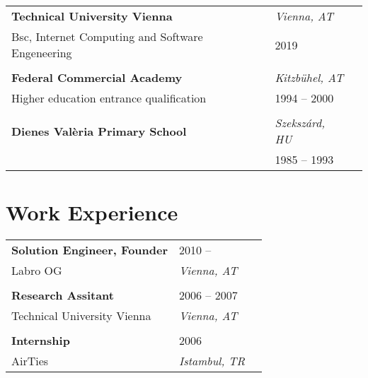 \documentclass[letterpaper,11pt]{article}
\begin{document}
\vspace{-1em}
\begin{longtable}{  L{0.70\textwidth}  R{0.25\textwidth}  R{0.05\textwidth }} 
		\textbf{Technical University Vienna} &  \textit{Vienna, AT} \\

	Bsc, Internet Computing and Software Engeneering & 2019 \\ 
\vspace{1pt}\\
		\textbf{Federal Commercial Academy} &  \textit{Kitzb\"{u}hel, AT} \\

	Higher education entrance qualification & 1994 -- 2000 \\ 
\vspace{1pt}\\
		\textbf{Dienes Val\`{e}ria Primary School} &  \textit{Szeksz\'{a}rd, HU} \\

	 & 1985 -- 1993 \\ 

\end{longtable}


\section{\bf Work Experience}
\vspace{-1em}
\begin{longtable}{  L{0.70\textwidth}  R{0.25\textwidth}  R{0.05\textwidth }} 
\textbf{Solution Engineer, Founder} & 2010 -- \\
Labro OG & \textit{Vienna, AT} \\
\vspace{1pt}\\
\textbf{Research Assitant} & 2006 -- 2007\\
Technical University Vienna & \textit{Vienna, AT} \\
\vspace{1pt}\\
\textbf{Internship} & 2006\\
AirTies & \textit{Istambul, TR} \\
\end{longtable}
\end{document}
